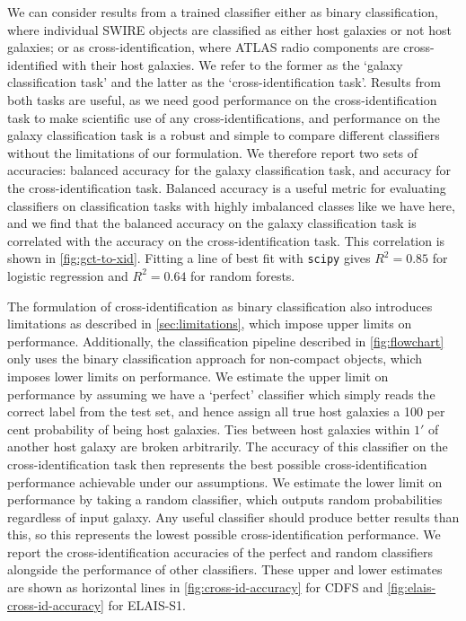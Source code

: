 \documentclass[fleqn,usenatbib,usedcolumn]{mnras}
\begin{document}
    We can consider results from a trained classifier either as binary
    classification, where individual SWIRE objects are classified as either
    host galaxies or not host galaxies; or as cross-identification, where
    ATLAS radio components are cross-identified with their host galaxies. We
    refer to the former as the `galaxy classification task' and the latter as
    the `cross-identification task'. Results from both tasks are useful, as we
    need good performance on the cross-identification task to make scientific
    use of any cross-identifications, and performance on the galaxy
    classification task is a robust and simple to compare different
    classifiers without the limitations of our formulation. We therefore
    report two sets of accuracies: balanced accuracy for the galaxy
    classification task, and accuracy for the cross-identification task.
    Balanced accuracy is a useful metric for evaluating classifiers on
    classification tasks with highly imbalanced classes like we have here, and
    we find that the balanced accuracy on the galaxy classification task is
    correlated with the accuracy on the cross-identification task. This
    correlation is shown in
    \autoref{fig:gct-to-xid}. Fitting a line of best fit with \texttt{scipy}
    gives $R^2 = 0.85$ for logistic regression and $R^2 = 0.64$ for random
    forests.

    The formulation of cross-identification as binary classification also
    introduces limitations as described in \autoref{sec:limitations}, which
    impose upper limits on performance. Additionally, the classification
    pipeline described in \autoref{fig:flowchart} only uses the binary
    classification approach for non-compact objects, which imposes lower
    limits on performance. We estimate the upper limit on performance by
    assuming we have a `perfect' classifier which simply reads the correct
    label from the test set, and hence assign all true host galaxies a 100 per
    cent probability of being host galaxies. Ties between host galaxies within
    $1'$ of another host galaxy are broken arbitrarily. The accuracy of this
    classifier on the cross-identification task then represents the best
    possible cross-identification performance achievable under our
    assumptions. We estimate the lower limit on performance by taking a random
    classifier, which outputs random probabilities regardless of input galaxy.
    Any useful classifier should produce better results than this, so this
    represents the lowest possible cross-identification performance. We report
    the cross-identification accuracies of the perfect and random classifiers
    alongside the performance of other classifiers. These upper and lower
    estimates are shown as horizontal lines in \autoref{fig:cross-id-accuracy}
    for CDFS and \autoref{fig:elais-cross-id-accuracy} for ELAIS-S1.
\end{document}
